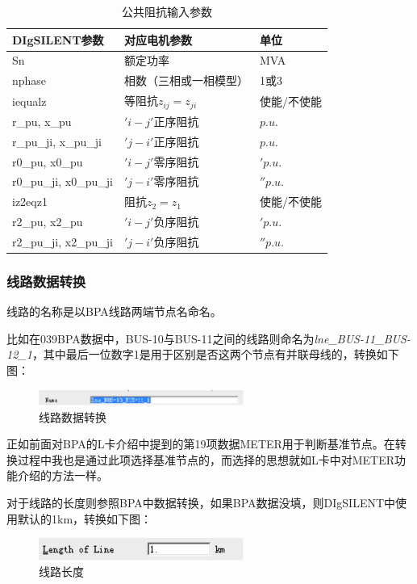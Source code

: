 \begin{table}[h]
\centering
\begin{tabular}{lll}
\toprule
DIgSILENT参数 & 对应电机参数 & 单位\\
 \midrule
Sn & 额定功率 & MVA\\
nphase & 相数（三相或一相模型） & 1或3\\
iequalz & 等阻抗$z_{ij} = z_{ji}$ & 使能/不使能\\
r\_pu, x\_pu & $'i-j'$正序阻抗 & $p.u.$\\
r\_pu\_ji, x\_pu\_ji & $'j-i'$正序阻抗 & $p.u.$ \\
r0\_pu, x0\_pu & $'i-j'$零序阻抗 & $'p.u.$ \\
r0\_pu\_ji, x0\_pu\_ji & $'j-i'$零序阻抗 & $''p.u.$ \\
iz2eqz1 & 阻抗$z_2 = z_1$ & 使能/不使能 \\
r2\_pu, x2\_pu & $'i-j'$负序阻抗 & $'p.u.$\\
r2\_pu\_ji, x2\_pu\_ji & $'j-i'$负序阻抗 & $''p.u.$\\
\bottomrule
\end{tabular}
\caption{公共阻抗输入参数}
\end{table}

\subsubsection{线路数据转换}

线路的名称是以BPA线路两端节点名命名。

比如在039BPA数据中，BUS-10与BUS-11之间的线路则命名为\emph{lne\_BUS-11\_BUS-12\_1}，其中最后一位数字1是用于区别是否这两个节点有并联母线的，转换如下图：

\begin{figure}[H]
\centering
\includegraphics[width=0.6\textwidth]{images/Paper_Fig_43.png}
\setcaptionwidth{\linewidth}
\caption{线路数据转换}
\end{figure}

正如前面对BPA的L卡介绍中提到的第19项数据METER用于判断基准节点。在转换过程中我也是通过此项选择基准节点的，而选择的思想就如L卡中对METER功能介绍的方法一样。

对于线路的长度则参照BPA中数据转换，如果BPA数据没填，则DIgSILENT中使用默认的1km，转换如下图：

\begin{figure}[H]
\centering
\includegraphics[width=0.6\textwidth]{images/Paper_Fig_44.png}
\setcaptionwidth{\linewidth}
\caption{线路长度}
\end{figure}

